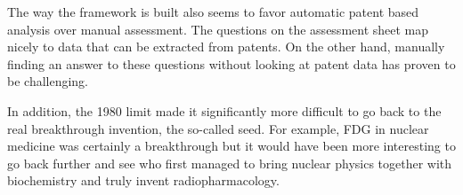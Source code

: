 The way the framework is built also seems to favor automatic patent based
analysis over manual assessment. The questions on the assessment sheet map
nicely to data that can be extracted from patents. On the other hand, manually
finding an answer to these questions without looking at patent data has proven
to be challenging.

In addition, the 1980 limit made it significantly more difficult to go back to
the real breakthrough invention, the so-called seed. For example, FDG in nuclear
medicine was certainly a breakthrough but it would have been more interesting to
go back further and see who first managed to bring nuclear physics together with
biochemistry and truly invent radiopharmacology.



